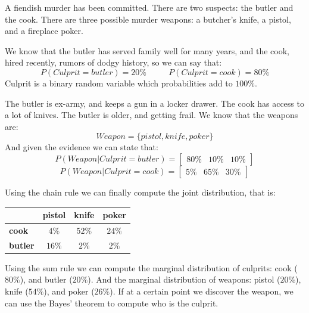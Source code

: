 \documentclass[12pt, a4paper]{report}
\begin{document}
    \begin{example}
        A fiendish murder has been committed. There are two suspects: the butler and the cook. There are three possible murder weapons: a butcher's knife, a pistol, and a 
        fireplace poker. 

        We know that the butler has served family well for many years, and the cook, hired recently, rumors of dodgy history, so we can say that: 
        \[P(Culprit=butler)=20\% \:\:\:\:\:\:\:\:\:\:\:\: P(Culprit=cook)=80\%\]
        Culprit is a binary random variable which probabilities add to $100\%$. 

        The butler is ex-army, and keeps a gun in a locker drawer. The cook has access to a lot of knives. The butler is older, and getting frail. We know that the weapons are: 
        \[Weapon=\{pistol,knife,poker\}\]
        And given the evidence we can state that: 
        \[P(Weapon|Culprit=butler)=\begin{bmatrix} 80\% & 10\% & 10\% \end{bmatrix}\]
        \[P(Weapon|Culprit=cook)=\begin{bmatrix} 5\% & 65\% & 30\% \end{bmatrix}\]
        
        Using the chain rule we can finally compute the joint distribution, that is: 
        \begin{table}[H]
            \centering
            \begin{tabular}{c|ccc|}
            \cline{2-4}
                                                  & \textbf{pistol} & \textbf{knife} & \textbf{poker} \\ \hline
            \multicolumn{1}{|l|}{\textbf{cook}}   & $4\%$           & $52\%$         & $24\%$         \\
            \multicolumn{1}{|l|}{\textbf{butler}} & $16\%$          & $2\%$          & $2\%$          \\ \hline
            \end{tabular}
        \end{table}

        Using the sum rule we can compute the marginal distribution of culprits: cook ($80\%$), and butler ($20\%$). 
        And the marginal distribution of weapons: pistol ($20\%$), knife ($54\%$), and poker ($26\%$). 
        If at a certain point we discover the weapon, we can use the Bayes' theorem to compute who is the culprit. 
    \end{example}
\end{document}
